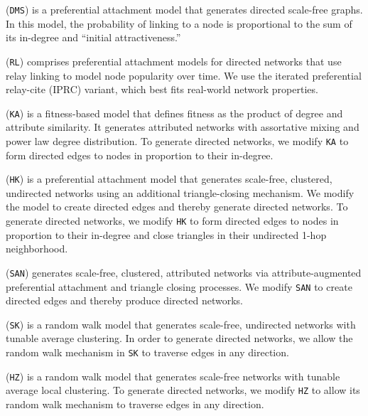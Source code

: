 		 \cite{dorogovtsev2000structure}  (\texttt{DMS})
		is a preferential attachment model that generates directed scale-free graphs. In this model,
		the probability of linking to a node is proportional to the sum of its in-degree and ``initial attractiveness.''

		 \cite{singh2017relay} (\texttt{RL}) comprises
		preferential attachment models for directed networks that use relay linking to model
		node popularity over time. We use the iterated preferential relay-cite (IPRC) variant, which best fits
		real-world network properties.

		 \cite{kim2017effect} (\texttt{KA}) is a fitness-based model that defines
		fitness as the product of degree and attribute similarity. It generates {attributed} networks
		with assortative mixing and power law degree distribution.
		To generate directed networks, we modify \texttt{KA} to form directed edges to nodes in proportion to their in-degree.

		 \cite{holme2002growing} (\texttt{HK}) is a preferential attachment model
		that generates scale-free, clustered, undirected networks using an additional triangle-closing mechanism.
		We modify the model to create directed edges and thereby generate directed networks.
		To generate directed networks, we modify \texttt{HK} to form directed edges to nodes in proportion to their in-degree
		and close triangles in their undirected 1-hop neighborhood.


		 \cite{gong2012evolution} (\texttt{SAN}) generates
		scale-free, clustered, attributed networks via attribute-augmented
		preferential attachment and triangle closing processes.
		We modify \texttt{SAN} to create directed edges and thereby produce directed networks.

		 \cite{saramaki2004scale} (\texttt{SK})
		is a random walk model that generates scale-free, undirected networks with tunable average clustering.
		In order to generate directed networks, we allow the random walk mechanism in \texttt{SK} to traverse edges in any direction.

		 \cite{herrera2011generating} (\texttt{HZ}) is a random walk model
		that generates scale-free networks with tunable average local clustering. To generate directed networks,
		we modify \texttt{HZ} to allow its random walk mechanism to traverse edges in any direction.

